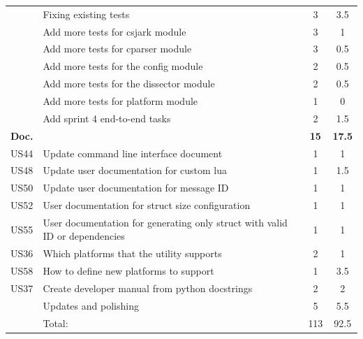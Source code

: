 \begin{table}[htbp]
\begin{tabularx}{\textwidth}{l X c c}
	 & Fixing existing tests & 3 & 3.5 \\
	 & Add more tests for csjark module & 3 & 1 \\
	 & Add more tests for cparser module & 3 & 0.5 \\
	 & Add more tests for the config module & 2 & 0.5 \\
	 & Add more tests for the dissector module & 2 & 0.5 \\
	 & Add more tests for platform module & 1 & 0 \\
	 & Add sprint 4 end-to-end tasks & 2 & 1.5 \\
	\addlinespace
	\textbf{Doc.} &  & \textbf{15} & \textbf{17.5} \\
	US44 & Update command line interface document & 1 & 1 \\
	US48 & Update user documentation for custom \Gls{lua} & 1 & 1.5 \\
	US50 & Update user documentation for message ID & 1 & 1 \\
	US52 & User documentation for \gls{struct} size configuration & 1 & 1 \\
	US55 & User documentation for generating only \gls{struct} with valid ID or dependencies & 1 & 1 \\
	US36 & Which platforms that the \gls{utility} supports & 2 & 1 \\
	US58 & How to define new platforms to support & 1 & 3.5 \\
	US37 & Create developer manual from python docstrings & 2 & 2 \\
	& Updates and polishing & 5 & 5.5 \\
	\midrule
	& Total: & 113 & 92.5 \\
	\bottomrule
\end{tabularx}
\end{table}

